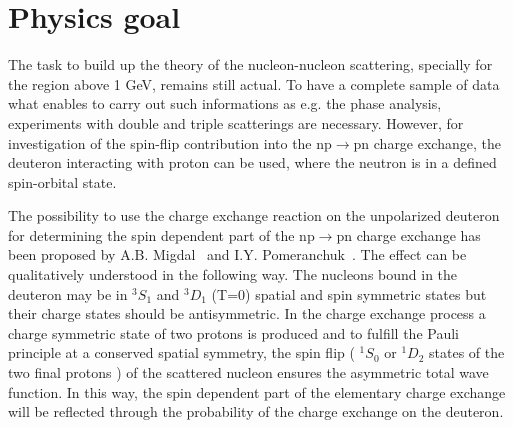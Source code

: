 \documentclass[a4paper,12pt]{article}
\begin{document}
\section{Physics goal}

\hspace{0.5cm}
The task to build up the theory of the nucleon-nucleon scattering, specially
for the region above 1 GeV, remains still actual. To have a complete sample
of data what enables to carry out such informations as e.g. the phase analysis,
experiments with double and
triple scatterings are necessary. However, for investigation of the spin-flip
contribution into the np$\to$pn charge exchange, the deuteron interacting with
proton can be used, where the neutron is in a defined spin-orbital state.

The possibility to use the charge exchange reaction on the unpolarized
deuteron for determining the spin dependent part of the np$\to$pn charge
exchange has been proposed by A.B. Migdal~\cite{Mig} and
I.Y. Pomeranchuk~\cite{Pom}. The effect can be qualitatively understood in
the following way. The nucleons bound in the deuteron may be in $^{3}S_{1}$
and $^{3}D_{1}$ (T=0) spatial and spin symmetric states but their charge states
should be antisymmetric. In the charge exchange process a charge
symmetric state of two protons is produced and to fulfill the Pauli principle
at a conserved spatial symmetry, the spin flip ( $^{1}S_{0}$ or $^{1}D_{2}$
states of the two final protons )
of the scattered nucleon ensures the asymmetric total wave function. In this
way, the spin dependent part of the elementary charge exchange will be
reflected through the probability of the charge exchange on the deuteron.
\end{document}

